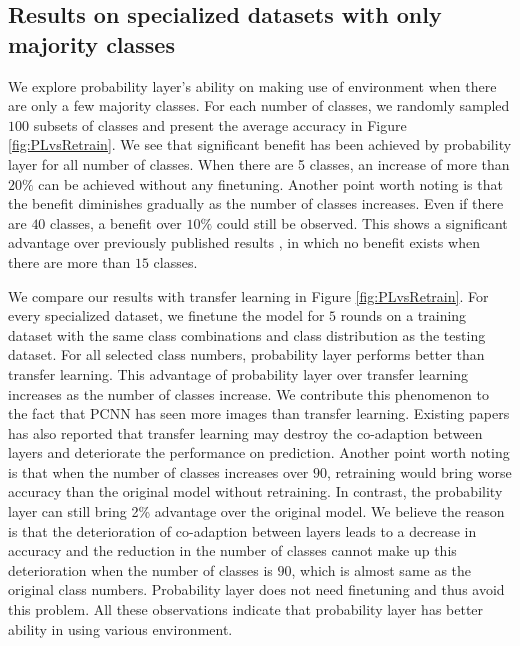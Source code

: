 \documentclass[pageno]{jpaper}
\begin{document}
\subsection{Results on specialized datasets with only majority classes}

We explore probability layer's ability on making use of environment when there are only a few majority classes. For each number of classes, we randomly sampled $100$ subsets of classes and present the average accuracy in Figure \ref{fig:PLvsRetrain}. We see that significant benefit has been achieved by probability layer for all number of classes. When there are 5 classes, an increase of more than $20\%$ can be achieved without any finetuning. Another point worth noting is that the benefit diminishes gradually as the number of classes increases. Even if there are $40$ classes, a benefit over $10\%$ could still be observed. This shows a significant advantage over previously published results \cite{shen2016fast}, in which no benefit exists when there are more than $15$ classes.
 
We compare our results with transfer learning in Figure \ref{fig:PLvsRetrain}. For every specialized dataset, we finetune the model for $5$ rounds on a training dataset with the same class combinations and class distribution as the testing dataset. For all selected class numbers, probability layer performs better than transfer learning. This advantage of probability layer over transfer learning increases as the number of classes increase. We contribute this phenomenon to the fact that PCNN has seen more images than transfer learning. Existing papers \cite{yosinski2014transferable} has also reported that transfer learning may destroy the co-adaption between layers and deteriorate the performance on prediction. Another point worth noting is that when the number of classes increases over $90$, retraining would bring worse accuracy than the original model without retraining. In contrast, the probability layer can still bring 2\% advantage over the original model. We believe the reason is that the deterioration of co-adaption between layers leads to a decrease in accuracy and the reduction in the number of classes cannot make up this deterioration when the number of classes is $90$, which is almost same as the original class numbers. Probability layer does not need finetuning and thus avoid this problem. All these observations indicate that probability layer has better ability in using various environment.
\end{document}
